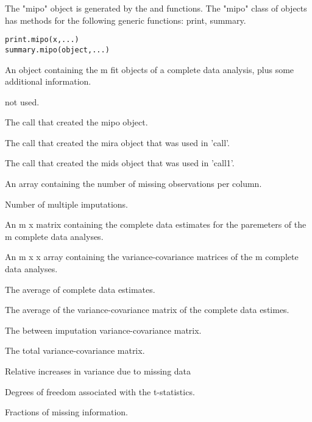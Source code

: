 \documentclass{article}
\begin{document}
\begin{Description}\relax
The "mipo" object is generated by the  and  functions.
The "mipo" class of objects has methods for the following generic functions:
print, summary.
\end{Description}
\begin{Usage}
\begin{verbatim}
print.mipo(x,...)
summary.mipo(object,...)
\end{verbatim}
\end{Usage}
\begin{Arguments}
\begin{ldescription}
\item[\code{x, object}] An object containing the m fit objects of a complete data analysis, 
plus some additional information.
\item[\code{...}] not used.
\end{ldescription}
\end{Arguments}
\begin{Value}
\begin{ldescription}
\item[\code{call}] The call that created the mipo object.
\item[\code{call1}] The call that created the mira object that was used in 'call'.
\item[\code{call2}] The call that created the mids object that was used in 'call1'.
\item[\code{nmis}] An array containing the number of missing observations per column.
\item[\code{m}] Number of multiple imputations.
\item[\code{qhat}] An m x  matrix containing the complete data estimates for the  paremeters of the m complete data analyses.
\item[\code{u}] An m x  x  array containing the variance-covariance matrices of the m complete data analyses.
\item[\code{qbar}] The average of complete data estimates.
\item[\code{ubar}] The average of the variance-covariance matrix of the complete data estimes.
\item[\code{b}] The between imputation variance-covariance matrix.
\item[\code{t}] The total variance-covariance matrix.
\item[\code{r}] Relative increases in variance due to missing data
\item[\code{df}] Degrees of freedom associated with the t-statistics.
\item[\code{f}] Fractions of missing information.
\end{ldescription}
\end{Value}
\end{document}
